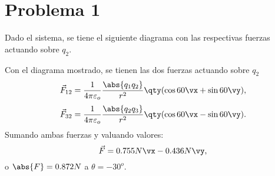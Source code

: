 \section*{Problema 1}
Dado el sistema, se tiene el siguiente diagrama con las respectivas fuerzas actuando sobre $q_2$.
\begin{center}
	
\end{center}

Con el diagrama mostrado, se tienen las dos fuerzas actuando sobre $q_2$
	$$ \vec{F} _{12} = \frac{1}{4\pi \varepsilon _o} \frac{\abs{q_1 q_2}}{r^2} \qty(\cos{60} \vx + \sin{60} \vy), $$
	$$ \vec{F} _{32} = \frac{1}{4\pi \varepsilon _o} \frac{\abs{q_2 q_3}}{r^2} \qty(\cos{60} \vx - \sin{60} \vy). $$
Sumando ambas fuerzas y valuando valores:
	$$ \vec{F} = 0.755 N \vx - 0.436N\vy , $$
o $\abs{F} = 0.872N$ a $\theta = -30^o$.












